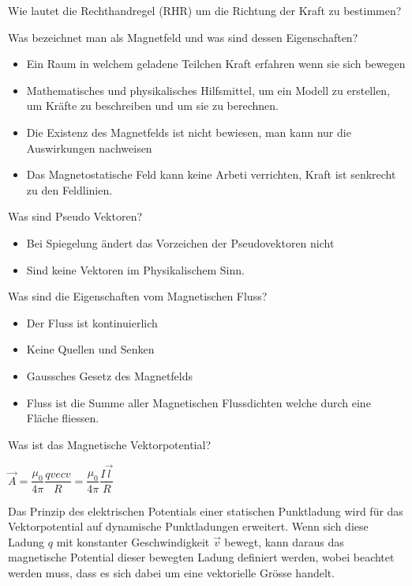 \begin{karte}{Wie lautet die Rechthandregel (RHR) um die Richtung der Kraft zu bestimmen?}
\begin{karte}{Was bezeichnet man als Magnetfeld und was sind dessen Eigenschaften?}
	\begin{itemize}
		\item Ein Raum in welchem geladene Teilchen Kraft erfahren wenn sie sich bewegen
		\item Mathematisches und physikalisches Hilfsmittel, um ein Modell zu erstellen, um Kräfte zu beschreiben und um sie zu berechnen.
		\item Die Existenz des Magnetfelds ist nicht bewiesen, man kann nur die Auswirkungen nachweisen
		\item Das Magnetostatische Feld kann keine Arbeti verrichten, Kraft ist senkrecht zu den Feldlinien.
	\end{itemize}
\end{karte}

\begin{karte}{Was sind Pseudo Vektoren?}
	\begin{itemize}
		\item Bei Spiegelung ändert das Vorzeichen der Pseudovektoren nicht
		\item Sind keine Vektoren im Physikalischem Sinn.
	\end{itemize}
\end{karte}

\begin{karte}{Was sind die Eigenschaften vom Magnetischen Fluss?}
	\begin{itemize}
		\item Der Fluss ist kontinuierlich
		\item Keine Quellen und Senken
		\item Gaussches Gesetz des Magnetfelds
		\item Fluss ist die Summe aller Magnetischen Flussdichten welche durch eine Fläche fliessen.
	\end{itemize}
\end{karte}

\begin{karte}{Was ist das Magnetische Vektorpotential?}
	\begin{center}
		\begin{huge}
			$\vec{A}=\dfrac{\mu_{0}}{4 \pi} \dfrac{q vec{v}}{R}=\dfrac{\mu_{0}}{4 \pi} \dfrac{I \vec{l}}{R}$
		\end{huge}
	\end{center}
	Das Prinzip des elektrischen Potentials einer statischen Punktladung wird für das Vektorpotential auf dynamische Punktladungen erweitert. Wenn sich diese Ladung $q$ mit konstanter Geschwindigkeit $\vec{v}$ bewegt, kann daraus das magnetische Potential dieser bewegten Ladung definiert werden, wobei beachtet werden muss, dass es sich dabei um eine vektorielle Grösse handelt.
\end{karte}


\end{karte}
